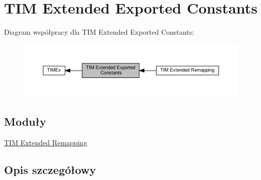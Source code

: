 \hypertarget{group___t_i_m_ex___exported___constants}{}\section{T\+IM Extended Exported Constants}
\label{group___t_i_m_ex___exported___constants}
Diagram współpracy dla T\+IM Extended Exported Constants\+:\nopagebreak
\begin{figure}[H]
\begin{center}
\leavevmode
\includegraphics[width=350pt]{group___t_i_m_ex___exported___constants}
\end{center}
\end{figure}
\subsection*{Moduły}
\begin{DoxyCompactItemize}
\item 
\hyperlink{group___t_i_m_ex___remap}{T\+I\+M Extended Remapping}
\end{DoxyCompactItemize}


\subsection{Opis szczegółowy}
